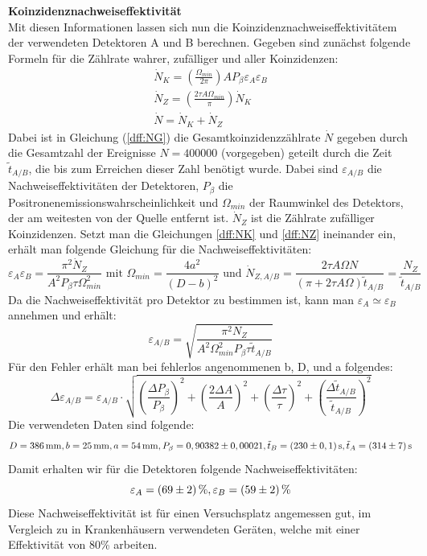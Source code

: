        \textbf{Koinzidenznachweiseffektivität}\\
       Mit diesen Informationen lassen sich nun die Koinzidenznachweiseffektivitätem der verwendeten Detektoren A und B berechnen. Gegeben sind zunächst folgende Formeln für die Zählrate wahrer, zufälliger und aller Koinzidenzen:
       \begin{gather}
           \dot N_K = \left( \frac{\Omega _{min}}{2\pi} \right) A P_\beta \varepsilon_A \varepsilon_B
           \label{dff:NK}\\
           \dot N_Z = \left( \frac{2\tau A\Omega _{min}}{\pi} \right)\dot N_K
           \label{dff:NZ}\\
           \dot N = \dot N_K + \dot N_Z
           \label{dff:NG}
       \end{gather}
       Dabei ist in Gleichung (\ref{dff:NG}) die Gesamtkoinzidenzzählrate $\dot N$ gegeben durch die Gesamtzahl der Ereignisse $N=400000$ (vorgegeben) geteilt durch die Zeit $\tilde t_{A/B}$, die bis zum Erreichen dieser Zahl benötigt wurde. 
       Dabei sind $\varepsilon_{A/B}$ die Nachweiseffektivitäten der Detektoren, $P_\beta$ die Positronenemissionswahrscheinlichkeit und $\Omega_{min}$ der Raumwinkel des Detektors, der am weitesten von der Quelle entfernt
       ist. $\dot N_Z$ ist die Zählrate zufälliger Koinzidenzen. Setzt man die Gleichungen \ref{dff:NK} und \ref{dff:NZ} ineinander ein, erhält man folgende Gleichung für die Nachweiseffektivitäten:
       $$ \varepsilon_A \varepsilon_B = \frac{\pi^2 \dot N_Z}{A^2 P_\beta \tau \Omega^2_{min}} \text{ mit } \Omega_{min} = \frac{4a^2}{\left(D-b\right)^2 } \text{ und } \dot N_{Z,A/B} = \frac{2\tau A \Omega N}{\left(\pi + 2\tau A \Omega\right) \tilde t_{A/B}} = \frac{N_Z}{\tilde t_{A/B}}$$
       Da die Nachweiseffektivität pro Detektor zu bestimmen ist, kann man $ \varepsilon_A \simeq \varepsilon_B $ annehmen und erhält:
       $$ \varepsilon_{A/B} = \sqrt{\frac{\pi^2 N_Z}{A^2 \Omega^2_{min} P_\beta \tau \tilde t_{A/B}}}$$ 
       Für den Fehler erhält man bei fehlerlos angenommenen b, D, und a folgendes:
       $$ \Delta\varepsilon_{A/B} = \varepsilon_{A/B} \cdot\sqrt{\left(\frac{\Delta P_\beta}{P_\beta}\right)^2+ \left(\frac{2\Delta A}{A}\right)^2 + \left(\frac{\Delta \tau}{\tau}\right)^2+ \left(\frac{\Delta \tilde t_{A/B}}{\tilde t_{A/B}}\right)^2}$$
       Die verwendeten Daten sind folgende:
       $$ D = \unit[386]{mm}, b = \unit[25]{mm}, a = \unit[54]{mm}, P_\beta = 0,90382 \pm 0,00021, \tilde t_B = \unit[(230 \pm 0,1)]{s} , \tilde t_A = \unit[(314\pm7)]{s}$$
       Damit erhalten wir für die Detektoren folgende Nachweiseffektivitäten:
       $$ \varepsilon_A = \unit[(69\pm 2)]{\%}, \varepsilon_B = \unit[(59\pm 2)]{\%}$$
       Diese Nachweiseffektivität ist für einen Versuchsplatz angemessen gut, im Vergleich zu in Krankenhäusern verwendeten Geräten, welche mit einer Effektivität von 80\% arbeiten.

